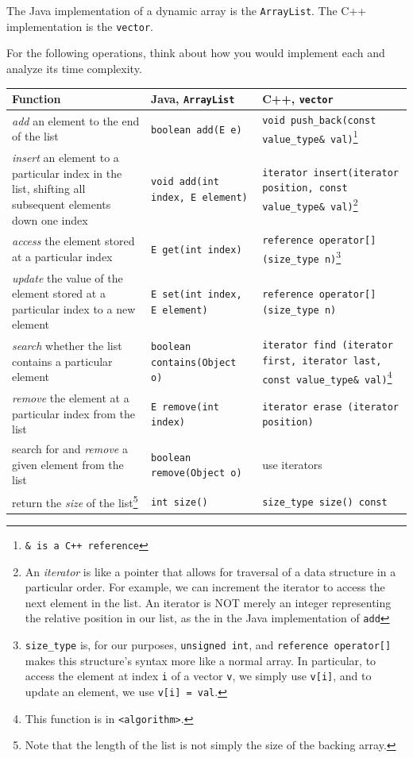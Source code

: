 The Java implementation of a dynamic array is the \texttt{ArrayList}. The C++ implementation is the \texttt{vector}.

For the following operations, think about how you would implement each and analyze its time complexity. 

\begin{center}
  \begin{tabular}{ | p{5cm} | p{5cm} | p{5cm} | }
    \hline
    \textbf{Function}	&	\textbf{Java, \texttt{ArrayList}}	&	\textbf{C++, \texttt{vector}} \\ \hline
    \textit{add} an element to the end of the list		&	\texttt{boolean add(E e)}	&	\texttt{void push\_back(const value\_type\& val)}\footnote{\texttt{\& is a C++ reference}} \\ \hline
    \textit{insert} an element to a particular index in the list, shifting all subsequent elements down one index	&	\texttt{void add(int index, E element)}		&	\texttt{iterator insert(iterator position, const value\_type\& val)}\footnote{An \textit{iterator} is like a pointer that allows for traversal of a data structure in a particular order. For example, we can increment the iterator to access the next element in the list. An iterator is NOT merely an integer representing the relative position in our list, as the in the Java implementation of \texttt{add}}	\\ \hline
    \textit{access} the element stored at a particular index	&	\texttt{E get(int index)}		&	\texttt{reference operator[] (size\_type n)}\footnote{\texttt{size\_type} is, for our purposes, \texttt{unsigned int}, and \texttt{reference operator[]} makes this structure's syntax more like a normal array. In particular, to access the element at index \texttt{i} of a vector \texttt{v}, we simply use \texttt{v[i]}, and to update an element, we use \texttt{v[i] = val}.}	\\ \hline
    \textit{update} the value of the element stored at a particular index to a new element & \texttt{E set(int index, E element)} & \texttt{reference operator[] (size\_type n)} \\ \hline
    \textit{search} whether the list contains a particular element & \texttt{boolean contains(Object o)} & \texttt{iterator find (iterator first, iterator last, const value\_type\& val)}\footnote{This function is in \texttt{<algorithm>}.} \\ \hline
    \textit{remove} the element at a particular index from the list & \texttt{E remove(int index)} & \texttt{iterator erase (iterator position)} \\ \hline
    search for and \textit{remove} a given element from the list & \texttt{boolean remove(Object o)} & use iterators \\ \hline
    return the \textit{size} of the list\footnote{Note that the length of the list is not simply the size of the backing array.} & \texttt{int size()} & \texttt{size\_type size() const} \\ \hline
  \end{tabular}
\end{center}


